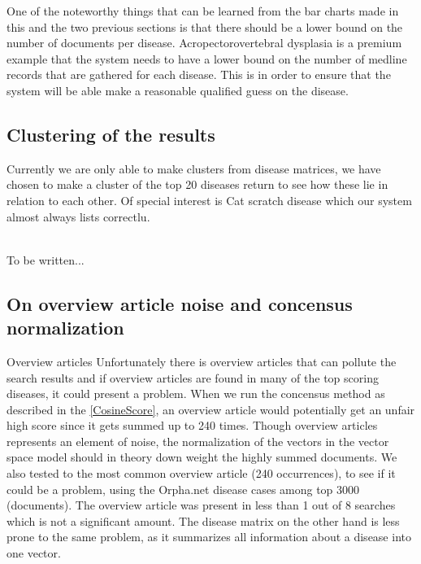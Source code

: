 One of the noteworthy things that can be learned from the bar charts made in this and the two previous sections is that there should be a lower bound on the number of documents per disease. Acropectorovertebral dysplasia is a premium example that the system needs to have a lower bound on the number of medline records that are gathered for each disease. This is in order to ensure that the system will be able make a reasonable qualified guess on the disease.

\subsection{Clustering of the results}
Currently we are only able to make clusters from disease matrices, we have chosen to make a cluster of the top 20 diseases return to see how these lie in relation to each other. Of special interest is Cat scratch disease which our system almost always lists correctlu. %



\\
To be written...




\subsection{On overview article noise and concensus normalization\label{Overview}}

Overview articles
Unfortunately there is overview articles that can pollute the search results and if overview articles are found in many of the top scoring diseases, it could present a problem. When we run the concensus method as described in the \ref{CosineScore}, an overview article would potentially get an unfair high score since it gets summed up to 240 times. Though overview articles represents an element of noise, the normalization of the vectors in the vector space model should in theory down weight the highly summed documents. We also tested to the most common overview article (240 occurrences), to see if it could be a problem, using the Orpha.net disease cases among top 3000 (documents). The overview article was present in less than 1 out of 8 searches which is not a significant amount. The disease matrix on the other hand is less prone to the same problem, as it summarizes all information about a disease into one vector. \\

